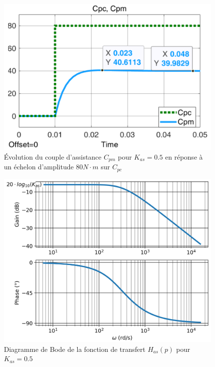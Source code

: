 \newpage

\begin{figure}[ht!]
\begin{center}
\includegraphics[width=.65\linewidth]{img/fig19}
\caption{\label{fig19}Évolution du couple d’assistance $C_{pm}$ pour $K_{as}=0.5$ en réponse à un échelon d’amplitude $80N\cdot m$ sur $C_{pc}$}
\end{center}
\end{figure}

\begin{figure}[ht!]
\begin{center}
\includegraphics[width=.8\linewidth]{img/fig20}
\caption{\label{fig20}Diagramme de Bode de la fonction de transfert $H_{as}(p)$ pour $K_{as}=0.5$}
\end{center}
\end{figure}

\finsujet

\debutcor


